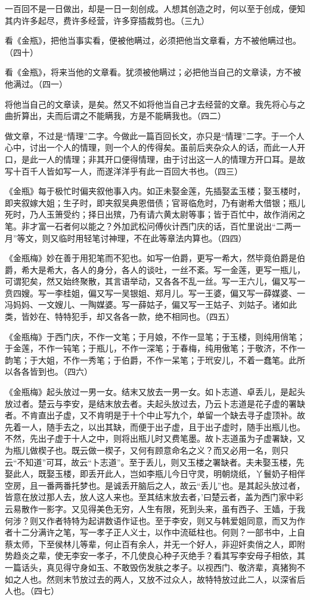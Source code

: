\begin{showcontents}{}
{一百回不是一日做出，却是一日一刻创成。人想其创造之时，何以至于创成，便知其内许多起尽，费许多经营，许多穿插裁剪也。（三九）

看《金瓶》，把他当事实看，便被他瞒过，必须把他当文章看，方不被他瞒过也。（四十）

看《金瓶》，将来当他的文章看。犹须被他瞒过；必把他当自己的文章读，方不被他满过。（四一）

将他当自己的文章读，是矣。然又不如将他当自己才去经营的文章。我先将心与之曲折算出，夫而后谓之不能瞒我，方是不能瞒我也。（四二）

做文章，不过是“情理”二字。今做此一篇百回长文，亦只是“情理”二字。于一个人心中，讨出一个人的情理，则一个人的传得矣。虽前后夹杂众人的话，而此一人开口，是此一人的情理；非其开口便得情理，由于讨出这一人的情理方开口耳。是故写十百千人皆如写一人，而遂洋洋乎有此一百回大书也。（四三）

《金瓶》每于极忙时偏夹叙他事入内。如正未娶金莲，先插娶孟玉楼；娶玉楼时，即夹叙嫁大姐；生子时，即夹叙吴典恩借债；官哥临危时，乃有谢希大借银；瓶儿死时，乃人玉箫受约；择日出殡，乃有请六黄太尉等事；皆于百忙中，故作消闲之笔。非才富一石者何以能之？外加武松问傅伙计西门庆的话，百忙里说出“二两一月”等文，则又临时用轻笔讨神理，不在此等章法内算也。（四四）

《金瓶梅》妙在善于用犯笔而不犯也。如写一伯爵，更写一希大，然毕竟伯爵是伯爵，希大是希大，各人的身分，各人的谈吐，一丝不紊。写一金莲，更写一瓶儿，可谓犯矣，然又始终聚散，其言语举动，又各各不乱一丝。写一王六儿，偏又写一贲四嫂。写一李桂姐，偏又写一吴银姐、郑月儿。写一王婆，偏又写一薛媒婆、一冯妈妈、一文嫂儿、一陶媒婆。写一薛姑子，偏又写一王姑子、刘姑子。诸如此类，皆妙在、特特犯手，却又各各一款，绝不相同也。（四五）

《金瓶梅》于西门庆，不作一文笔；于月娘，不作一显笔；于玉楼，则纯用俏笔；于金莲，不作一钝笔；于瓶儿，不作一深笔；于春梅，纯用傲笔；于敬济，不作一韵笔；于大姐，不作一秀笔；于伯爵，不作一呆笔；于玳安儿，不着一蠢笔。此所以各各皆到也。（四六）

《金瓶梅》起头放过一男一女。结末又放去一男一女。如卜志道、卓丢儿，是起头放过者。楚云与李安，是结末放去者。夫起头放过去，乃云卜志道是花子虚的署缺者。不肯直出子虚，又不肯明是于十个中止写九个，单留一个缺去寻子虚顶补。故先着一人，随手去之，以出其缺，而便于出子虚，且于出子虚时，随手出瓶儿也。不然，先出子虚于十人之中，则将出瓶儿时又费笔墨。故卜志道虽为子虚署缺，又为瓶儿做楔子也。既云做一楔子，又何有顾意命名之义？而又必用一名，则只云“不知道”可耳，故云“卜志道”。至于丢儿，则又玉楼之署缺者。夫未娶玉楼，先娶此人，既娶玉楼，即丢开此人，岂如李瓶儿今日守灵，明朝烧纸，丫鬟奶子相伴空房，且一番两番托梦也。是诚丢开脑后之人，故云“丢儿”也。是其起头放过者，皆意在放过那人去，放人这人来也。至其结末放去者，’曰楚云者，盖为西门家中彩云易散作一影字。又见得美色无穷，人生有限，死到头来，虽有西子、王嫱，于我何涉？则又作者特特为起讲数语作证也。至于李安，则又与韩爱姐同意，而又为作者十二分满许之笔，写一孝子正人义士，以作中流砥柱也。何则？一部书中，上自蔡太师，下至侯林儿等辈，何止百有余人，并无一个好人，非迎奸卖俏之人，即附势趋炎之辈，使无李安一孝子，不几使良心种子灭绝手？看其写李安母子相依，其一篇话头，真见得守身如玉、不敢毁伤发肤之孝子。以视西门、敬济辈，真猪狗不如之人也。然则末节放过去的两人，又放不过众人，故特特放过此二人，以深省后人也。（四七）

}
\end{showcontents}
